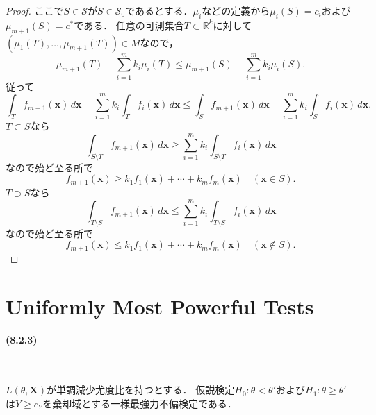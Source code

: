 \begin{proof}
  ここで\(S \in \mathcal{S}\)が\(S \in \mathcal{S}_0\)であるとする．\(\mu_i\)などの定義から\(\mu_i(S)=c_i\)および\(\mu_{m+1}(S)=c^*\)である．
  任意の可測集合\(T \subset \mathbb{R}^k\)に対して\((\mu_1(T), \ldots, \mu_{m+1}(T)) \in M\)なので，
  \[ \mu_{m+1}(T) - \sum_{i=1}^m k_i \mu_i(T) \leq \mu_{m+1}(S) -  \sum_{i=1}^m k_i \mu_i(S) . \]
  従って
  \[
  \int_T f_{m+1}(\boldsymbol{x}) \, d\boldsymbol{x} - \sum_{i=1}^m k_i \int_T f_i(\boldsymbol{x}) \, d\boldsymbol{x}
  \leq \int_S f_{m+1}(\boldsymbol{x}) \, d\boldsymbol{x} - \sum_{i=1}^m k_i \int_S f_i(\boldsymbol{x}) \, d\boldsymbol{x} .
  \]
  \(T \subset S\)なら
  \[ \int_{S\setminus T} f_{m+1}(\boldsymbol{x}) \, d\boldsymbol{x} \geq \sum_{i=1}^m k_i \int_{S\setminus T} f_i(\boldsymbol{x}) \, d\boldsymbol{x} \]
  なので殆ど至る所で
  \[ f_{m+1}(\boldsymbol{x}) \geq k_1 f_1(\boldsymbol{x}) + \cdots + k_m f_m(\boldsymbol{x}) \quad (\boldsymbol{x} \in S) . \]
  \(T \supset S\)なら
  \[ \int_{T\setminus S} f_{m+1}(\boldsymbol{x}) \, d\boldsymbol{x} \leq \sum_{i=1}^m k_i \int_{T\setminus S} f_i(\boldsymbol{x}) \, d\boldsymbol{x} \]
  なので殆ど至る所で
  \[ f_{m+1}(\boldsymbol{x}) \leq k_1 f_1(\boldsymbol{x}) + \cdots + k_m f_m(\boldsymbol{x}) \quad (\boldsymbol{x} \not\in S) . \]
\end{proof}

\section{Uniformly Most Powerful Tests}
\paragraph{(8.2.3)}~
\begin{screen}
  \(L(\theta, \boldsymbol{X})\)が単調減少尤度比を持つとする．
  仮説検定\(H_0\colon\theta < \theta'\)および\(H_1\colon\theta\geq\theta'\)は\(Y \geq c_Y\)を棄却域とする一様最強力不偏検定である．
\end{screen}
